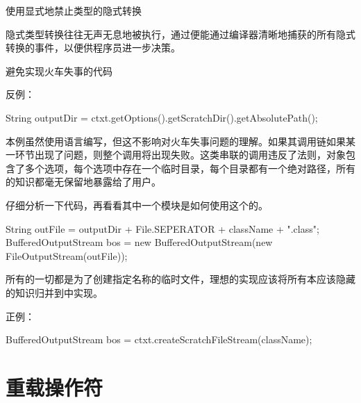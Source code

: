 \begin{content}
\begin{regulation}
使用显式地禁止类型的隐式转换
\end{regulation}

隐式类型转换往往无声无息地被执行，通过便能通过编译器清晰地捕获的所有隐式转换的事件，以便供程序员进一步决策。

\begin{regulation}
避免实现火车失事的代码
\end{regulation}

反例：
\begin{leftbar}
\begin{java}
String outputDir = ctxt.getOptions().getScratchDir().getAbsolutePath();
\end{java}
\end{leftbar}

本例虽然使用语言编写，但这不影响对火车失事问题的理解。如果其调用链如果某一环节出现了问题，则整个调用将出现失败。这类串联的调用违反了法则，对象包含了多个选项，每个选项中存在一个临时目录，每个目录都有一个绝对路径，所有的知识都毫无保留地暴露给了用户。

仔细分析一下代码，再看看其中一个模块是如何使用这个的。

\begin{leftbar}
\begin{java}
String outFile = outputDir + File.SEPERATOR + className + ".class";
BufferedOutputStream bos = new BufferedOutputStream(new FileOutputStream(outFile));
\end{java}
\end{leftbar}

所有的一切都是为了创建指定名称的临时文件，理想的实现应该将所有本应该隐藏的知识归并到中实现。

正例：
\begin{leftbar}
\begin{c++}
BufferedOutputStream bos = ctxt.createScratchFileStream(className);
\end{c++}
\end{leftbar}

\end{content}

\section{重载操作符}

